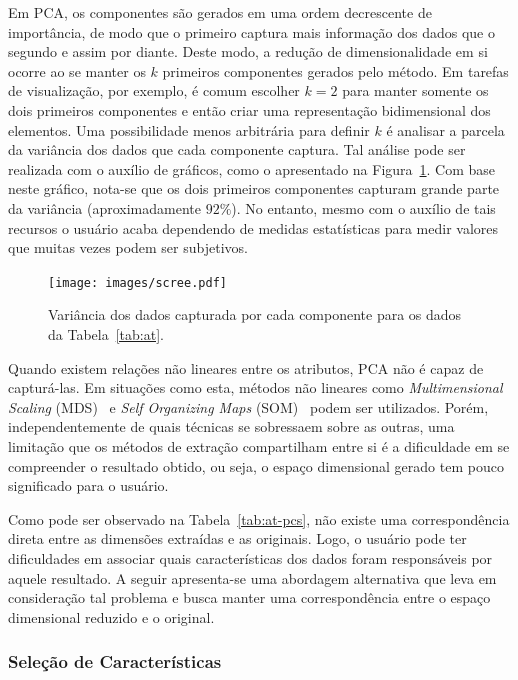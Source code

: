 Em PCA, os componentes são gerados em uma ordem decrescente
de importância, de modo que o primeiro captura mais
informação dos dados que o segundo e assim por diante.
Deste modo, a redução de dimensionalidade em si ocorre ao se
manter os $k$ primeiros componentes gerados pelo método. Em
tarefas de visualização, por exemplo, é comum escolher $k=2$
para manter somente os dois primeiros componentes e então
criar uma representação bidimensional dos elementos. Uma
possibilidade menos arbitrária para definir $k$ é analisar a
parcela da variância dos dados que cada componente captura.
Tal análise pode ser realizada com o auxílio de gráficos,
como o apresentado na Figura~\ref{fig:scree}. Com base neste
gráfico, nota-se que os dois primeiros componentes capturam
grande parte da variância (aproximadamente $92\%$). No
entanto, mesmo com o auxílio de tais recursos o usuário
acaba dependendo de medidas estatísticas para medir valores
que muitas vezes podem ser subjetivos.

\begin{figure}[h!]
    \centering
    \texttt{[image: images/scree.pdf]}
    \caption[Variância capturada pelos PCs]
        {Variância dos dados capturada por cada componente
        para os dados da Tabela~\ref{tab:at}. }
    \label{fig:scree}
\end{figure}

Quando existem relações não lineares entre os atributos, PCA
não é capaz de capturá-las. Em situações como esta, métodos
não lineares como \textit{Multimensional Scaling}
(MDS)~\cite{Cox2002} e \textit{Self Organizing Maps}
(SOM)~\cite{Kohonen1990} podem ser utilizados. Porém,
independentemente de quais técnicas se sobressaem sobre as
outras, uma limitação que os métodos de extração
compartilham entre si é a dificuldade em se compreender o
resultado obtido, ou seja, o espaço dimensional gerado tem
pouco significado para o usuário. 

Como pode ser observado na Tabela~\ref{tab:at-pcs}, não
existe uma correspondência direta entre as dimensões
extraídas e as originais. Logo, o usuário pode ter
dificuldades em associar quais características dos dados
foram responsáveis por aquele resultado. A seguir
apresenta-se uma abordagem alternativa que leva em
consideração tal problema e busca manter uma correspondência
entre o espaço dimensional reduzido e o original.

\subsubsection{Seleção de Características} 

